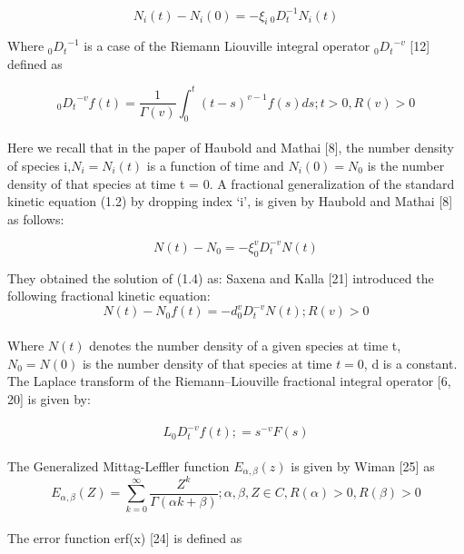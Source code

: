 \documentclass[leqno]{article}
\begin{document}
\begin{equation}
N_i (t) - N_i (0) = -\xi _{i}\,{_0 D_t^{-1}}N_i (t)
\end{equation}


Where ${_0 D_t}^{-1}$ is a case of the Riemann \- Liouville integral operator ${_0 D_t}^{-v}$ [12] defined as

\begin{equation}
    {_0 D_t}^{-v} f (t) = \frac{1}{\Gamma{(v)}}
    \int_0^t(t - s)^{v-1}
    f(s)ds;
    t > 0,
    R(v) > 0 
\end{equation}

\paragraph{}
Here we recall that in the paper of Haubold and Mathai [8], the number density of species i,$N_i = N_i (t)$ is a function of time and $N_i (0) = N_0$ is the number density of that species at time t = 0.
A fractional generalization of the standard kinetic equation (1.2) by dropping index ‘i’, is given by Haubold and Mathai [8] as follows:

\begin{equation}
    N(t) - N_0
    =-\xi ^v_0
    D^{-v}_t
    N (t)
\end{equation}

They obtained the solution of (1.4) as:
Saxena and Kalla [21] introduced the following fractional kinetic equation:
\begin{equation}
    N(t) - N_0f(t)
    =-d ^v_0
    D^{-v}_t
    N (t)
    ;R(v) > 0
\end{equation}
\paragraph{}
Where $N(t)$ denotes the number density of a given species at time t,$N_0 = N(0)$ is the number density of that species at time $t = 0$, d is a constant.
The Laplace transform of the Riemann–Liouville fractional integral operator [6, 20] is given by:
\\
\\
\begin{equation}
L_0D_t^{-v}f(t);=s^{-v}F(s)
\end{equation}
\\
The Generalized Mittag-Leffler function $E_{\alpha , \beta}(z)$ is given by Wiman [25] as
\\ 
\begin{equation}
    E_{\alpha , \beta}(Z) 
    = \sum_{k = 0}^{\infty}
    \frac{Z^k}{\Gamma{(\alpha k + \beta)}};
    \alpha ,
    \beta ,
    Z \in C,
    R(\alpha) > 0,
    R(\beta) > 0
\end{equation}
\\ 
The error function erf(x) [24] is defined as 
\end{document}
